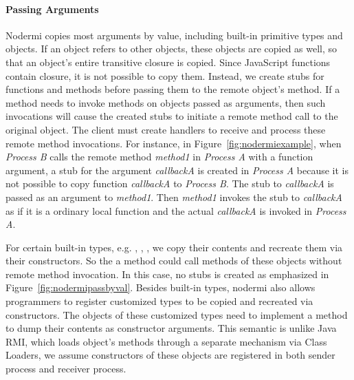 \nodermipassbyreffig{}


\nodrmipassbyvalfig{}


\paragraph{Passing Arguments}
Nodermi copies most arguments by value, including built-in primitive types
and objects.  If an object refers to other objects, these objects are copied 
as well, so that an object's entire transitive closure is copied.
Since JavaScript functions contain closure, it is not possible to copy them.
Instead, we create stubs for functions and methods before passing them
to the remote object's method.  If a method needs to invoke 
methods on objects passed as arguments, then such invocations
will cause the created stubs to initiate a remote method
call to the original object.  The client must create handlers
to receive and process these remote method invocations.
For instance, in Figure~\ref{fig:nodermiexample}, 
when \emph{Process B} calls the remote method \emph{method1}
in \emph{Process A} with a function argument,
a stub for the argument
\emph{callbackA} is created in \emph{Process A} because
it is not possible to copy function \emph{callbackA} to \emph{Process B}.
The stub to \emph{callbackA} is passed as an argument to
 \emph{method1}.
Then \emph{method1} invokes the stub to \emph{callbackA} as if it is a ordinary
 local function and the actual \emph{callbackA} is invoked in \emph{Process A}. 


For certain built-in types, e.g. , , , 
we copy their contents and recreate them via their constructors.
So the a method could call methods of these objects without 
remote method invocation.
In this case, no stubs is created as emphasized in Figure~\ref{fig:nodermipassbyval}.
Besides built-in types, nodermi also allows programmers to
register customized types to be copied and recreated via constructors.
The objects of these customized types need to implement a method to dump
their contents as constructor arguments.
This semantic is unlike Java RMI\cite{j2eedoc}, which loads
object's methods through a separate mechanism via Class Loaders,
we assume constructors of these objects are registered in
both sender process and receiver process.

